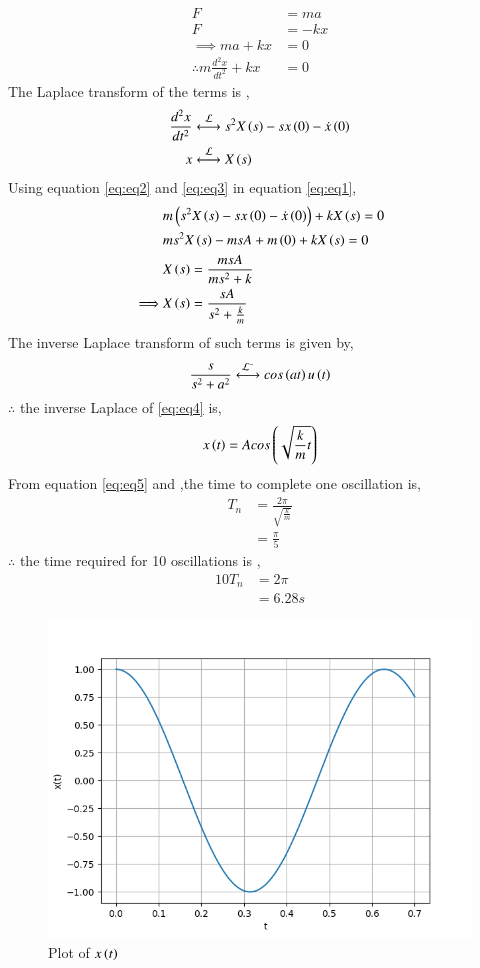 \documentclass[journal,12pt,twocolumn]{IEEEtran}
\theoremstyle{remark}
\begin{document}
\solution\\

\begin{align}
    F &= ma \\
    F &= -kx \\
    \implies ma + kx &= 0\\
    \therefore m\frac{d^2x}{dt^2} + kx &= 0\label{eq:eq1}
\end{align}
The Laplace transform of the terms is ,
\begin{align}
    \frac{d^2x}{dt^2} & \system{\mathcal{L}} s^2 X\brak{s} - sx\brak{0} - \dot{x}\brak{0}\label{eq:eq2}\\
    x & \system{\mathcal{L}} X\brak{s}\label{eq:eq3}
\end{align}
Using equation \eqref{eq:eq2} and \eqref{eq:eq3} in equation \eqref{eq:eq1},
\begin{align}
    &m\left(s^2 X\left(s\right) - sx\left(0\right) - \dot{x}\left(0\right)\right) + kX\left(s\right) = 0\\
    &ms^2X\left(s\right) -msA + m\left(0\right) + kX\left(s\right) = 0\\
    &X\left(s\right) = \frac{msA}{ms^2 + k} \\
    \implies &X\left(s\right) = \frac{sA}{s^2 + \frac{k}{m}} \label{eq:eq4}
\end{align}
The inverse Laplace transform of such terms is given by,
\begin{align}
    \frac{s}{s^2 + a^2} \system{\mathcal{L^{ -}}} cos\brak{at}u\brak{t}
\end{align}
$\therefore$ the inverse Laplace of \eqref{eq:eq4} is,
\begin{align}
    x\left(t\right) = Acos\left(\sqrt{\frac{k}{m}t}\right) \label{eq:eq5}
\end{align}
From equation \eqref{eq:eq5} and  ,the time to complete one oscillation is,
\begin{align}
    T_n &= \frac{2\pi}{\sqrt{\frac{k}{m}}}\\
    &= \frac{\pi}{5}\label{eq:eq6}
\end{align}
$\therefore$ the time required for 10 oscillations is ,
\begin{align}
    10T_n &= 2\pi\\
    &= 6.28 s
\end{align}
\begin{figure}[!ht]
\centering
\begin{center}
\includegraphics[width=\columnwidth]{Figure_1}
\end{center}
\caption{Plot of $x\left(t\right)$}
\end{figure}
\end{document}
